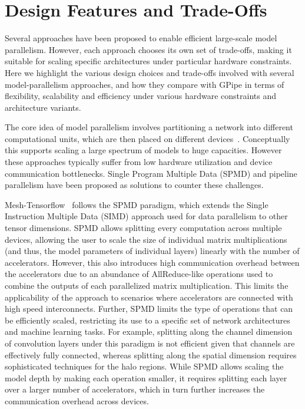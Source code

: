 \documentclass{article}
\def\codename{GPipe}
\begin{document}
\section{Design Features and Trade-Offs}

Several approaches have been proposed to enable efficient large-scale model parallelism. However, each approach chooses its own set of trade-offs, making it suitable for scaling specific architectures under particular hardware constraints. Here we highlight the various design choices and trade-offs involved with several model-parallelism approaches, and how they compare with \codename{} in terms of flexibility, scalability and efficiency under various hardware constraints and architecture variants.

The core idea of model parallelism involves partitioning a network into different computational units, which are then placed on different devices~\cite{krizhevsky2014one, lee2014model, mirhoseini2017device,dean12disbelief}. Conceptually this supports scaling a large spectrum of models to huge capacities. However these approaches typically suffer from low hardware utilization and device communication bottlenecks. Single Program Multiple Data (SPMD) and pipeline parallelism have been proposed as solutions to counter these challenges.

Mesh-Tensorflow~\cite{shazeer2018mesh} follows the SPMD paradigm, which extends the Single Instruction Multiple Data (SIMD) approach used for data parallelism to other tensor dimensions. SPMD allows splitting every computation across multiple devices, allowing the user to scale the size of individual matrix multiplications (and thus, the model parameters of individual layers) linearly with the number of accelerators. However, this also introduces high communication overhead between the accelerators due to an abundance of AllReduce-like operations used to combine the outputs of each parallelized matrix multiplication. This limits the applicability of the approach to scenarios where accelerators are connected with high speed interconnects. Further, SPMD limits the type of operations that can be efficiently scaled, restricting its use to a specific set of network architectures and machine learning tasks. For example, splitting along the channel dimension of convolution layers under this paradigm is not efficient given that channels are effectively fully connected, whereas splitting along the spatial dimension requires sophisticated techniques for the halo regions. While SPMD allows scaling the model depth by making each operation smaller, it requires splitting each layer over a larger number of accelerators, which in turn further increases the communication overhead across devices.
\end{document}
